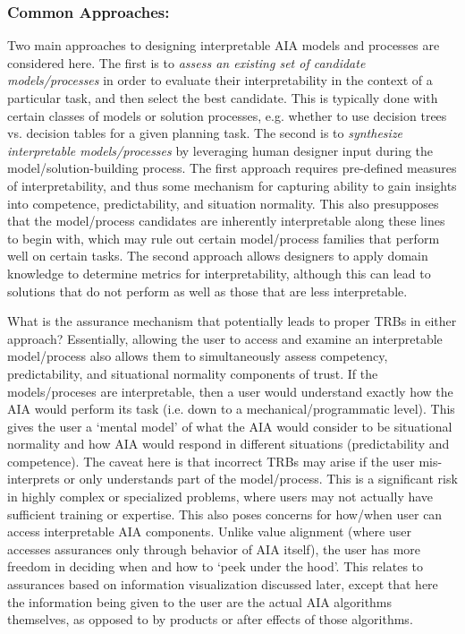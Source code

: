 \subsubsection{Common Approaches:}
Two main approaches to designing interpretable AIA models and processes are considered here. 
The first is to \emph{assess an existing set of candidate models/processes} in order to evaluate their interpretability in the context of a particular task, and then select the best candidate. 
This is typically done with certain classes of models or solution processes, e.g. whether to use decision trees vs. decision tables for a given planning task. 
The second is to \emph{synthesize interpretable models/processes} by leveraging human designer input during the model/solution-building process. 
The first approach requires pre-defined measures of interpretability, and thus some mechanism for capturing ability to gain insights into competence, predictability, and situation normality. This also presupposes that the model/process candidates are inherently interpretable along these lines to begin with, which may rule out certain model/process families that perform well on certain tasks. 
The second approach allows designers to apply domain knowledge to determine metrics for interpretability, although this can lead to solutions that do not perform as well as those that are less interpretable. 

What is the assurance mechanism that potentially leads to proper TRBs in either approach? 
Essentially, allowing the user to access and examine an interpretable model/process also allows them to simultaneously assess competency, predictability, and situational normality components of trust. If the models/proceses are interpretable, then a user would understand exactly how the AIA would perform its task (i.e. down to a mechanical/programmatic level). 
This gives the user a `mental model' of what the AIA would consider to be situational normality and how AIA would respond in different situations (predictability and competence). 
The caveat here is that incorrect TRBs may arise if the user mis-interprets or only understands part of the model/process. 
This is a significant risk in highly complex or specialized problems, where users may not actually have sufficient training or expertise. This also poses concerns for how/when user can access interpretable AIA components. 
Unlike value alignment (where user accesses assurances only through behavior of AIA itself), the user has more freedom in deciding when and how to `peek under the hood'. This relates to assurances based on information visualization discussed later, except that here the information being given to the user are the actual AIA algorithms themselves, as opposed to by products or after effects of those algorithms. 

